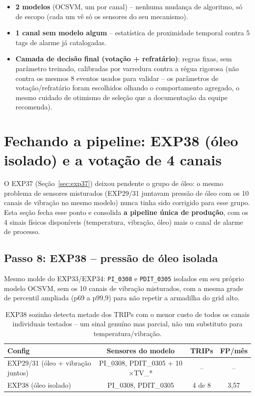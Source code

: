\documentclass[11pt,a4paper]{article}
\begin{document}
\begin{itemize}
  \item \textbf{2 modelos} (OCSVM, um por canal) -- nenhuma mudança de
    algoritmo, só de escopo (cada um vê só os sensores do seu
    mecanismo).
  \item \textbf{1 canal sem modelo algum} -- estatística de
    proximidade temporal contra 5 tags de alarme já catalogadas.
  \item \textbf{Camada de decisão final (votação + refratário)}: regras
    fixas, sem parâmetro treinado, calibradas por varredura contra a
    régua rigorosa (não contra os mesmos 8 eventos usados para
    validar -- os parâmetros de votação/refratário foram escolhidos
    olhando o comportamento agregado, o mesmo cuidado de otimismo de
    seleção que a documentação da equipe recomenda).
\end{itemize}

\section{Fechando a pipeline: EXP38 (óleo isolado) e a votação de 4 canais}
\label{sec:pipeline-final}

O EXP37 (Seção~\ref{sec:exp37}) deixou pendente o grupo de óleo: o
mesmo problema de sensores misturados (EXP29/31 juntavam pressão de
óleo com os 10 canais de vibração no mesmo modelo) nunca tinha sido
corrigido para esse grupo. Esta seção fecha esse ponto e consolida
\textbf{a pipeline única de produção}, com os 4 sinais físicos
disponíveis (temperatura, vibração, óleo) mais o canal de alarme de
processo.

\subsection{Passo 8: EXP38 -- pressão de óleo isolada}

Mesmo molde do EXP33/EXP34: \texttt{PI\_0308} e \texttt{PDIT\_0305}
isolados em seu próprio modelo OCSVM, sem os 10 canais de vibração
misturados, com a mesma grade de percentil ampliada (p69 a p99,9) para
não repetir a armadilha do grid alto.

\begin{table}[H]
\centering
\begin{tabular}{lccc}
\toprule
\textbf{Config} & \textbf{Sensores do modelo} & \textbf{TRIPs} & \textbf{FP/mês} \\
\midrule
EXP29/31 (óleo + vibração juntos) & PI\_0308, PDIT\_0305 + 10$\times$TV\_* & -- & -- \\
EXP38 (óleo isolado) & PI\_0308, PDIT\_0305 & 4 de 8 & 3,57 \\
\bottomrule
\end{tabular}
\caption{EXP38 sozinho detecta metade dos TRIPs com o menor custo de
todos os canais individuais testados -- um sinal genuíno mas parcial,
não um substituto para temperatura/vibração.}
\end{table}
\end{document}
